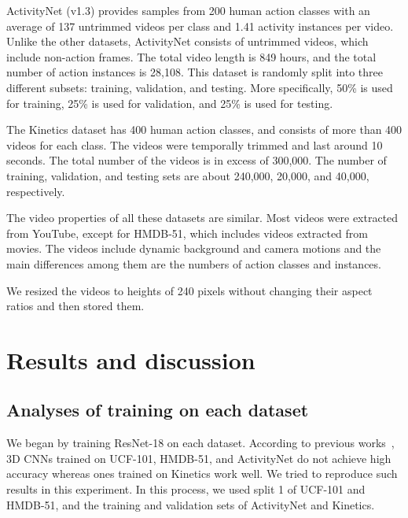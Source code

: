 \documentclass[10pt,twocolumn,letterpaper]{article}
\begin{document}
    ActivityNet (v1.3) provides samples from 200 human action classes with an average of 137 untrimmed videos per class and 1.41 activity instances per video.
    Unlike the other datasets, ActivityNet consists of untrimmed videos, which include non-action frames.
    The total video length is 849 hours,
    and the total number of action instances is 28,108.
    This dataset is randomly split into three different subsets:
    training, validation, and testing.
    More specifically, 50\% is used for training, 25\% is used for validation, and 25\% is used for testing.

    The Kinetics dataset has 400 human action classes,
    and consists of more than 400 videos for each class.
    The videos were temporally trimmed and last around 10 seconds.
    The total number of the videos is in excess of 300,000.
    The number of training, validation, and testing sets are about
    240,000, 20,000, and 40,000, respectively.

    The video properties of all these datasets are similar.
    Most videos were extracted from YouTube, except for HMDB-51,
    which includes videos extracted from movies.
    The videos include dynamic background and camera motions and
    the main differences among them are the numbers of action classes and instances.

    We resized the videos to heights of 240 pixels without changing their aspect ratios and then stored them.

\section{Results and discussion}\label{sec:exp}
  \subsection{Analyses of training on each dataset}\label{sec:exp_resnet18}
    We began by training ResNet-18 on each dataset.
    According to previous works~\cite{Hara_2017_ICCV_Workshops,Kinetics},
    3D CNNs trained on UCF-101, HMDB-51, and ActivityNet do not achieve high accuracy
    whereas ones trained on Kinetics work well.
    We tried to reproduce such results in this experiment.
    In this process, we used split 1 of UCF-101 and HMDB-51,
    and the training and validation sets of ActivityNet and Kinetics.
\end{document}
